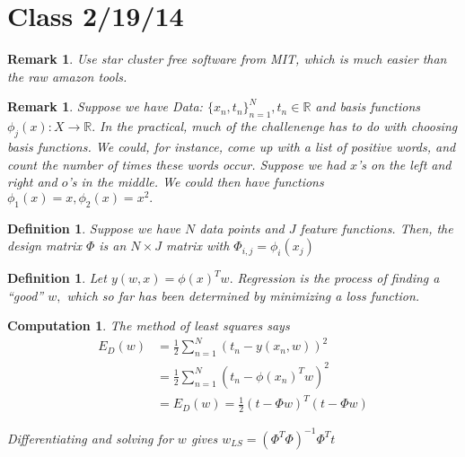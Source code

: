 \documentclass{amsart}
\newtheorem{comp}[subsubsection]{Computation}
\newtheorem{defn}[subsubsection]{Definition}
\newtheorem{rem}[subsubsection]{Remark}
\begin{document}
\section{Class 2/19/14}

\begin{rem}
Use star cluster free software from MIT, which is much easier than the raw amazon tools.
\end{rem}

\begin{rem}
Suppose we have Data: $\{x_n, t_n\}_{n=1}^N, t_n \in \mathbb R$ and basis functions $\phi_j(x):X\rightarrow \mathbb R.$ In the practical, much of the challenenge has to do with choosing basis functions. We could, for instance, come up with a list of positive words, and count the number of times these words occur. Suppose we had $x$'s on the left and right and $o$'s in the middle. We could then have functions $\phi_1(x) = x, \phi_2(x) = x^2.$ 
\end{rem}

\begin{defn}
Suppose we have $N$ data points and $J$ feature functions. Then, the design matrix $\Phi$ is an $N \times J$ matrix with $\Phi_{i,j} = \phi_i(x_j)$
\end{defn}

\begin{defn}
Let $y(w,x) = \phi(x)^Tw.$ Regression is the process of finding a ``good'' $w,$ which so far has been determined by minimizing a loss function.
\end{defn}

\begin{comp}
The method of least squares says
\begin{align*}
E_D(w) &= \frac 1 2 \sum_{n=1}^N (t_n - y(x_n,w))^2
\\
&= \frac 1 2 \sum_{n=1}^N (t_n - \phi(x_n)^Tw)^2
\\
& = E_D(w) = \frac 1 2 (t-\Phi w )^T (t -\Phi w)
\end{align*}

Differentiating and solving for $w$ gives $w_{LS} = (\Phi^T\Phi)^{-1}\Phi^T t$
\end{comp}
\end{document}
